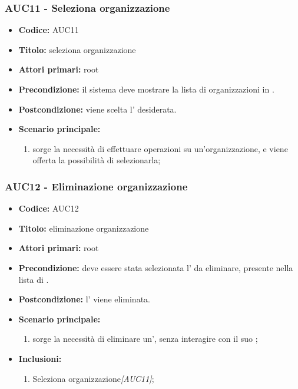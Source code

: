 \documentclass[casi-duso]{subfiles}
\begin{document}
\subsubsection{AUC11 - Seleziona organizzazione}
\label{subsub:AUC11}
\begin{itemize}
  \item \textbf{Codice:} AUC11
  \item \textbf{Titolo:} seleziona organizzazione
  \item \textbf{Attori primari:} root
  \item \textbf{Precondizione:} il sistema deve mostrare la lista di organizzazioni in .
  \item \textbf{Postcondizione:} viene scelta l' desiderata.
  \item \textbf{Scenario principale:}
  \begin{enumerate}
    \item sorge la necessità di effettuare operazioni su un'organizzazione, e viene offerta la possibilità di selezionarla;
  \end{enumerate}
\end{itemize}

\subsubsection{AUC12 - Eliminazione organizzazione}
\label{subsub:AUC12}
\begin{itemize}
  \item \textbf{Codice:} AUC12
  \item \textbf{Titolo:} eliminazione organizzazione
  \item \textbf{Attori primari:} root
  \item \textbf{Precondizione:} deve essere stata selezionata l' da eliminare, presente nella lista di .
  \item \textbf{Postcondizione:} l' viene eliminata.
  \item \textbf{Scenario principale:} 
  \begin{enumerate}
    \item sorge la necessità di eliminare un', senza interagire con il suo ;
  \end{enumerate}
  \item \textbf{Inclusioni:}
  \begin{enumerate}
    \item Seleziona organizzazione\emph{[AUC11]};
  \end{enumerate}
\end{itemize}
\end{document}
